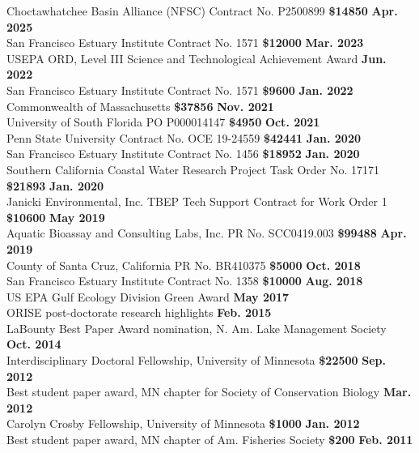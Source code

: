 \documentclass[letterpaper,12pt]{article}
\begin{document}
Choctawhatchee Basin Alliance (NFSC) Contract No. P2500899 {\bf \$14850} \hfill {\bf Apr. 2025} \\
San Francisco Estuary Institute Contract No. 1571 {\bf \$12000} \hfill {\bf Mar. 2023} \\
USEPA ORD, Level III Science and Technological Achievement Award \hfill {\bf Jun. 2022} \\
San Francisco Estuary Institute Contract No. 1571 {\bf \$9600} \hfill {\bf Jan. 2022} \\
Commonwealth of Massachusetts {\bf \$37856} \hfill {\bf Nov. 2021} \\
University of South Florida PO P000014147 {\bf \$4950} \hfill {\bf Oct. 2021} \\
Penn State University Contract No. OCE 19-24559 {\bf \$42441} \hfill {\bf Jan. 2020} \\
San Francisco Estuary Institute Contract No. 1456 {\bf \$18952} \hfill {\bf Jan. 2020} \\
Southern California Coastal Water Research Project Task Order No. 17171 {\bf \$21893} \hfill {\bf Jan. 2020} \\
Janicki Environmental, Inc. TBEP Tech Support Contract for Work Order 1 {\bf \$10600} \hfill {\bf May 2019} \\
Aquatic Bioassay and Consulting Labs, Inc. PR No. SCC0419.003 {\bf \$99488} \hfill {\bf Apr. 2019} \\
County of Santa Cruz, California PR No. BR410375 {\bf \$5000} \hfill {\bf Oct. 2018} \\
San Francisco Estuary Institute Contract No. 1358 {\bf \$10000} \hfill {\bf Aug. 2018} \\
US EPA Gulf Ecology Division Green Award \hfill {\bf May 2017} \\
ORISE post-doctorate research highlights \hfill {\bf Feb. 2015} \\
LaBounty Best Paper Award nomination, N. Am. Lake Management Society \hfill {\bf Oct. 2014} \\
Interdisciplinary Doctoral Fellowship, University of Minnesota {\bf \$22500} \hfill {\bf Sep. 2012} \\
Best student paper award, MN chapter for Society of Conservation Biology \hfill {\bf Mar. 2012} \\
Carolyn Crosby Fellowship, University of Minnesota {\bf \$1000} \hfill {\bf Jan. 2012} \\
Best student paper award, MN chapter of Am. Fisheries Society {\bf \$200} \hfill {\bf Feb. 2011} \\
\end{document}
